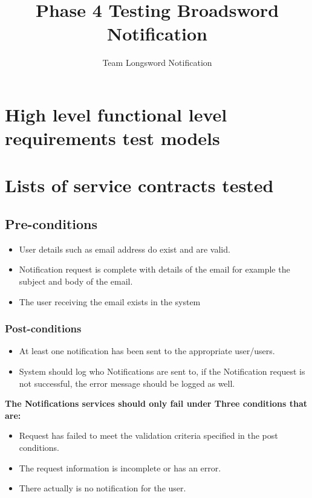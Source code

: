 \documentclass[11pt]{article}
\author{Team Longsword Notification}
\title{Phase 4 Testing Broadsword Notification}
\begin{document}
	\setlength{\parskip}{6pt}
	
	
	
	\tableofcontents
	
	\newpage
	
	\section{High level functional level requirements test models}
	\section{Lists of service contracts tested}
	\subsection{Pre-conditions}
	\begin{itemize}
		\item User details such as email address do exist and are valid.
		\item Notification request is complete with details of the email for example the subject and body of the email.
		\item The user receiving the email exists in the system
	\end{itemize}
	\subsubsection{Post-conditions}
	\begin{itemize}
		\item At least one notification has been sent to the appropriate user/users.
		\item System should log who Notifications are sent to, if the Notification request is not successful, the error message should be logged as well.
	\end{itemize}
	\textbf{The Notifications services should only fail under Three conditions that are:}
	\begin{itemize}
		\item Request has failed to meet the validation criteria specified in the post conditions.
		\item The request information is incomplete or has an error.
		\item There actually is no notification for the user.
	\end{itemize}
\end{document}
